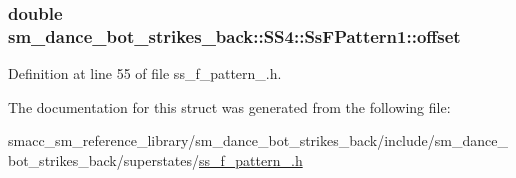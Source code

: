 \subsubsection[{\texorpdfstring{offset}{offset}}]{\setlength{\rightskip}{0pt plus 5cm}double sm\+\_\+dance\+\_\+bot\+\_\+strikes\+\_\+back\+::\+S\+S4\+::\+Ss\+F\+Pattern1\+::offset}\hypertarget{structsm__dance__bot__strikes__back_1_1SS4_1_1SsFPattern1_ab149ca1fffb4c5dcf749234d0e89ad40}{}\label{structsm__dance__bot__strikes__back_1_1SS4_1_1SsFPattern1_ab149ca1fffb4c5dcf749234d0e89ad40}


Definition at line 55 of file ss\+\_\+f\+\_\+pattern\+\_.\+h.



The documentation for this struct was generated from the following file\+:\begin{DoxyCompactItemize}
\item 
smacc\+\_\+sm\+\_\+reference\+\_\+library/sm\+\_\+dance\+\_\+bot\+\_\+strikes\+\_\+back/include/sm\+\_\+dance\+\_\+bot\+\_\+strikes\+\_\+back/superstates/\hyperlink{strikes__back_2include_2sm__dance__bot__strikes__back_2superstates_2ss__f__pattern__1_8h}{ss\+\_\+f\+\_\+pattern\+\_.\+h}\end{DoxyCompactItemize}
